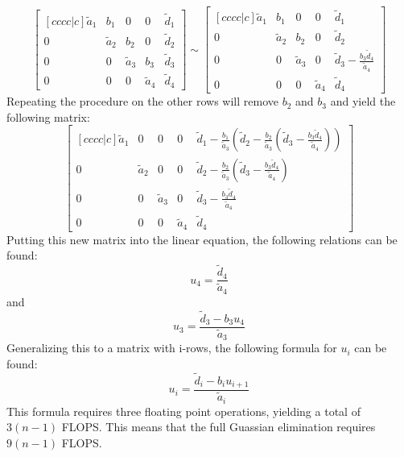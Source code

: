 \documentclass[12pt]{article}
\begin{document}
\begin{equation}
\begin{bmatrix}[cccc|c]
                           \tilde{a}_{1}&b_{1}&0&0&\tilde{d}_{1}\\
                           0&\tilde{a}_{2}&b_{2}&0&\tilde{d}_{2}\\
                           0&0&\tilde{a}_{3}&b_{3}&\tilde{d}_{3}\\
                           0&0&0&\tilde{a}_{4}&\tilde{d}_{4}
                      \end{bmatrix}
                      \sim
                      \begin{bmatrix}[cccc|c]
                           \tilde{a}_{1}&b_{1}&0&0& \tilde{d}_{1}\\
                           0&\tilde{a}_{2}&b_{2}&0& \tilde{d}_{2}\\
                           0&0&\tilde{a}_{3}&0& \tilde{d}_{3}-\frac{b_{3}\tilde{d}_{4}}{\tilde{a}_{4}}\\
                           0&0&0&\tilde{a}_{4}& \tilde{d}_{4}
                      \end{bmatrix}
\end{equation}
Repeating the procedure on the other rows will remove $b_{2}$ and $b_{3}$ and yield the following matrix:
\begin{equation}
\begin{bmatrix}[cccc|c]
\tilde{a}_{1}&0&0&0&\tilde{d}_{1}-\frac{b_{1}}{\tilde{a}_{3}}(\tilde{d}_{2}-\frac{b_{2}}{\tilde{a}_{3}}(\tilde{d}_{3}-\frac{b_{3}\tilde{d}_{4}}{\tilde{a}_{4}})) \\
0&\tilde{a}_{2}&0&0&\tilde{d}_{2}-\frac{b_{2}}{\tilde{a}_{3}}(\tilde{d}_{3}-\frac{b_{3}\tilde{d}_{4}}{\tilde{a}_{4}})\\
0&0&\tilde{a}_{3}&0&\tilde{d}_{3}-\frac{b_{3}\tilde{d}_{4}}{\tilde{a}_{4}}\\
0&0&0&\tilde{a}_{4}&\tilde{d}_{4}

\end{bmatrix}
\end{equation}
Putting this new matrix into the linear equation, the following relations can be found:
\begin{equation}
u_{4}=\frac{\tilde{d}_{4}}{\tilde{a}_{4}}
\end{equation}
and
\begin{equation}
u_{3}=\frac{\tilde{d}_{3}-b_{3}u_{4}}{\tilde{a}_{3}}
\end{equation}
Generalizing this to a matrix with i-rows, the following formula for $u_{i}$ can be found:
\begin{equation}
u_{i}=\frac{\tilde{d}_{i}-b_{i}u_{i+1}}{\tilde{a}_{i}}
\end{equation}
This formula requires three floating point operations, yielding a total of $3(n-1)$ FLOPS. This means that the full Guassian elimination requires $9(n-1)$ FLOPS. 
\end{document}
